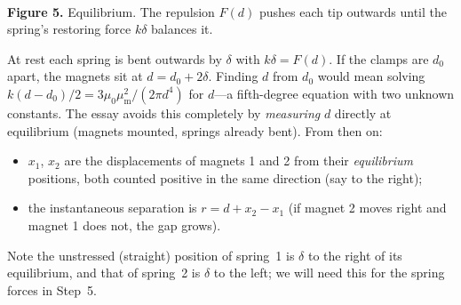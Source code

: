 \documentclass[11pt,a4paper]{article}
\newcommand{\muz}{\mu_0}
\newcommand{\mum}{\mu_{\mathrm m}}
\begin{document}
\begin{center}
\\[2pt]
{\small\textbf{Figure 5.} Equilibrium. The repulsion $F(d)$ pushes each tip outwards until the spring's restoring force $k\delta$ balances it.}
\end{center}

At rest each spring is bent outwards by $\delta$ with $k\delta=F(d)$. If the clamps are $d_0$ apart, the magnets sit at $d=d_0+2\delta$. Finding $d$ from $d_0$ would mean solving $k(d-d_0)/2=3\muz\mum^2/(2\pi d^4)$ for $d$---a fifth-degree equation with two unknown constants. The essay avoids this completely by \emph{measuring} $d$ directly at equilibrium (magnets mounted, springs already bent). From then on:
\begin{itemize}[nosep]
\item $x_1$, $x_2$ are the displacements of magnets 1 and 2 from their \emph{equilibrium} positions, both counted positive in the same direction (say to the right);
\item the instantaneous separation is $r=d+x_2-x_1$ (if magnet 2 moves right and magnet 1 does not, the gap grows).
\end{itemize}
Note the unstressed (straight) position of spring~1 is $\delta$ to the right of its equilibrium, and that of spring~2 is $\delta$ to the left; we will need this for the spring forces in Step~5.
\end{document}
